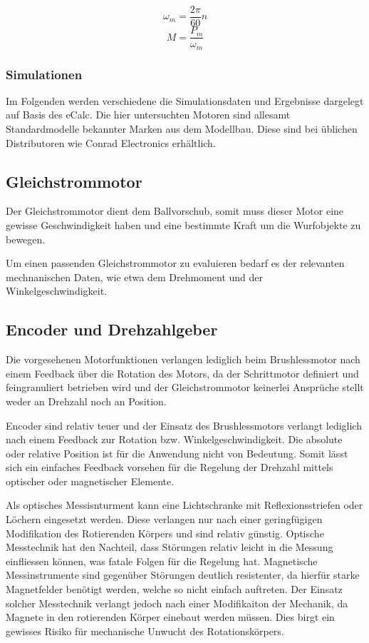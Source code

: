 \[ \omega_m = \frac{2\pi}{60} n \]
\[ M = \frac{P_m}{\omega_m} \]

\subsubsection{Simulationen}
Im Folgenden werden verschiedene die Simulationsdaten und Ergebnisse
dargelegt auf Basis des eCalc. Die hier untersuchten Motoren sind
allesamt Standardmodelle bekannter Marken aus dem Modellbau. Diese
sind bei üblichen Distributoren wie Conrad Electronics erhältlich.

\newpage


\newpage


\newpage


\newpage

\newpage

\subsection{Gleichstrommotor}
Der Gleichstrommotor dient dem Ballvorschub, somit muss dieser Motor
eine gewisse Geschwindigkeit haben und eine bestimmte Kraft um die
Wurfobjekte zu bewegen.

Um einen passenden Gleichstrommotor zu evaluieren bedarf es der relevanten
mechnanischen Daten, wie etwa dem Drehmoment und der Winkelgeschwindigkeit.


\subsection{Encoder und Drehzahlgeber}
Die vorgesehenen Motorfunktionen verlangen lediglich beim Brushlessmotor
nach einem Feedback über die Rotation des Motors, da der Schrittmotor
definiert und feingranuliert betrieben wird und der Gleichstrommotor
keinerlei Ansprüche stellt weder an Drehzahl noch an Position.

Encoder sind relativ teuer und der Einsatz des Brushlessmotors verlangt
lediglich nach einem Feedback zur Rotation bzw. Winkelgeschwindigkeit.
Die absolute oder relative Position ist für die Anwendung nicht von
Bedeutung. Somit lässt sich ein einfaches Feedback vorsehen für die
Regelung der Drehzahl mittels optischer oder magnetischer Elemente.

Als optisches Messisnturment kann eine Lichtschranke mit 
Reflexionsstriefen oder Löchern eingesetzt werden. Diese verlangen
nur nach einer geringfügigen Modifikation des Rotierenden Körpers und
sind relativ günstig. Optische Messtechnik hat den Nachteil, dass
Störungen relativ leicht in die Messung einfliessen können, was fatale
Folgen für die Regelung hat. Magnetische Messinstrumente sind gegenüber
Störungen deutlich resistenter, da hierfür starke Magnetfelder benötigt
werden, welche so nicht einfach auftreten. Der Einsatz solcher Messtechnik
verlangt jedoch nach einer Modifikaiton der Mechanik, da Magnete in den
rotierenden Körper einebaut werden müssen. Dies birgt ein gewisses
Risiko für mechanische Unwucht des Rotationskörpers.

